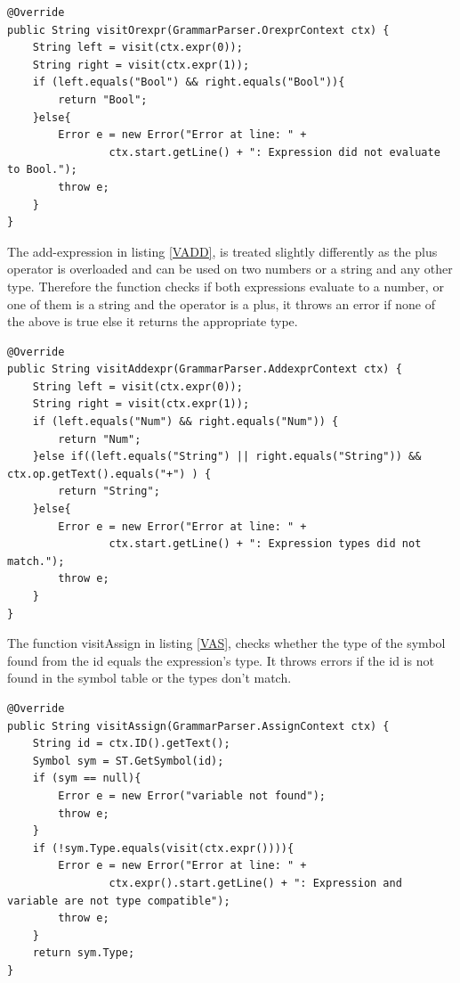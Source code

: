 \begin{lstlisting}[caption={SymbolTypeVisitor - visitOrexpr function}, label={VOR}]
@Override
public String visitOrexpr(GrammarParser.OrexprContext ctx) {
    String left = visit(ctx.expr(0));
    String right = visit(ctx.expr(1));
    if (left.equals("Bool") && right.equals("Bool")){
        return "Bool";
    }else{
        Error e = new Error("Error at line: " +
                ctx.start.getLine() + ": Expression did not evaluate to Bool.");
        throw e;
    }
}
\end{lstlisting}

The add-expression in listing \ref{VADD}, is treated slightly differently as the plus operator is overloaded and can be used on two numbers or a string and any other type. Therefore the function checks if both expressions evaluate to a number, or one of them is a string and the operator is a plus, it throws an error if none of the above is true else it returns the appropriate type. 

\begin{lstlisting}[caption={SymbolTypeVisitor - visitAddexpr function}, label={VADD}]
@Override
public String visitAddexpr(GrammarParser.AddexprContext ctx) {
    String left = visit(ctx.expr(0));
    String right = visit(ctx.expr(1));
    if (left.equals("Num") && right.equals("Num")) {
        return "Num";
    }else if((left.equals("String") || right.equals("String")) && ctx.op.getText().equals("+") ) {
        return "String";
    }else{
        Error e = new Error("Error at line: " +
                ctx.start.getLine() + ": Expression types did not match.");
        throw e;
    }
}
\end{lstlisting}

The function visitAssign in listing \ref{VAS}, checks whether the type of the symbol found from the id equals the expression's type. It throws errors if the id is not found in the symbol table or the types don't match. 

\begin{lstlisting}[caption={SymbolTypeVisitor - visitAssign function}, label={VAS}]
@Override
public String visitAssign(GrammarParser.AssignContext ctx) {
    String id = ctx.ID().getText();
    Symbol sym = ST.GetSymbol(id);
    if (sym == null){
        Error e = new Error("variable not found");
        throw e;
    }
    if (!sym.Type.equals(visit(ctx.expr()))){
        Error e = new Error("Error at line: " +
                ctx.expr().start.getLine() + ": Expression and variable are not type compatible");
        throw e;
    }
    return sym.Type;
}
\end{lstlisting}

